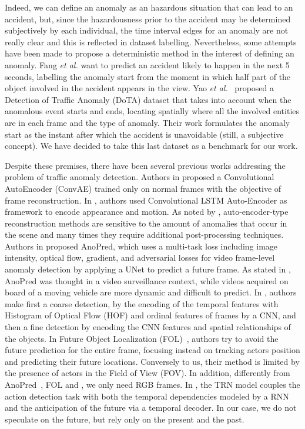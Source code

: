 Indeed, we can define an anomaly as an hazardous situation that can lead to an accident, but, since the hazardousness prior to the accident may be determined subjectively by each individual, the time interval edges for an anomaly are not really clear and this is reflected in dataset labelling.
Nevertheless, some attempts have been made to propose a deterministic method in the interest of defining an anomaly.
Fang \emph{et al.} \cite{fang2019dada} want to predict an accident likely to happen in the next 5 seconds, labelling the anomaly start from the moment in which half part of the object involved in the accident appears in the view.
Yao \emph{et al.}~\cite{yao2020when} proposed a Detection of Traffic Anomaly (DoTA) dataset that takes into account when the anomalous event starts and ends, locating spatially where all the involved entities are in each frame and the type of anomaly.
Their work formulates the anomaly start as the instant after which the accident is unavoidable (still, a subjective concept).
We have decided to take this last dataset as a benchmark for our work.

Despite these premises, there have been several previous works addressing the problem of traffic anomaly detection.
Authors in \cite{hasan2016learning} proposed a Convolutional AutoEncoder (ConvAE) trained only on normal frames with the objective of frame reconstruction.
In \cite{luo2017remembering, wang2018abnormal}, authors used Convolutional LSTM Auto-Encoder as framework to encode appearance and motion.
As noted by \cite{ramachandra2020survey}, auto-encoder-type reconstruction methods are sensitive to the amount of anomalies that occur in the scene and many times they require additional post-processing techniques.
Authors in \cite{liu2018future} proposed AnoPred, which uses a multi-task loss including image intensity, optical flow, gradient, and adversarial losses for video frame-level anomaly detection by applying a UNet to predict a future frame.
As stated in \cite{9712446}, AnoPred was thought in a video surveillance context, while videos acquired on board of a moving vehicle are more dynamic and difficult to predict.
In \cite{zhou_spatio-temporal_2022}, authors make first a coarse detection, by the encoding of the temporal features with Histogram of Optical Flow (HOF) \cite{wang2013action} and ordinal features of frames by a CNN, and then a fine detection by encoding the CNN features and spatial relationships of the objects.
In Future Object Localization (FOL)~\cite{9712446}, authors try to avoid the future prediction for the entire frame, focusing instead on tracking actors position and predicting their future locations.
Conversely to us, their method is limited by the presence of actors in the Field of View (FOV).
In addition, differently from AnoPred~\cite{liu2018future}, FOL \cite{9712446} and \cite{zhou_spatio-temporal_2022}, we only need RGB frames.
In \cite{xu2019temporal}, the TRN model couples the action detection task with both the temporal dependencies modeled by a RNN and the anticipation of the future via a temporal decoder.
In our case, we do not speculate on the future, but rely only on the present and the past.

